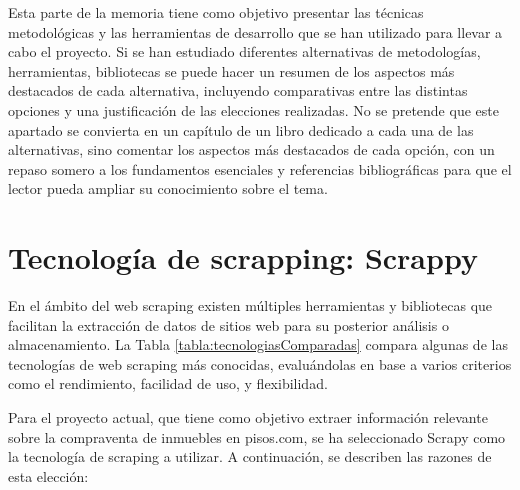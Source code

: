 
Esta parte de la memoria tiene como objetivo presentar las técnicas metodológicas y las herramientas de desarrollo que se han utilizado para llevar a cabo el proyecto. Si se han estudiado diferentes alternativas de metodologías, herramientas, bibliotecas se puede hacer un resumen de los aspectos más destacados de cada alternativa, incluyendo comparativas entre las distintas opciones y una justificación de las elecciones realizadas. 
No se pretende que este apartado se convierta en un capítulo de un libro dedicado a cada una de las alternativas, sino comentar los aspectos más destacados de cada opción, con un repaso somero a los fundamentos esenciales y referencias bibliográficas para que el lector pueda ampliar su conocimiento sobre el tema.

\section{Tecnología de scrapping: Scrappy}


En el ámbito del web scraping existen múltiples herramientas y bibliotecas que facilitan la extracción de datos de sitios web para su posterior análisis o almacenamiento. La Tabla \ref{tabla:tecnologiasComparadas} compara algunas de las tecnologías de web scraping más conocidas, evaluándolas en base a varios criterios como el rendimiento, facilidad de uso, y flexibilidad.

Para el proyecto actual, que tiene como objetivo extraer información relevante sobre la compraventa de inmuebles en pisos.com, se ha seleccionado Scrapy como la tecnología de scraping a utilizar. A continuación, se describen las razones de esta elección:


